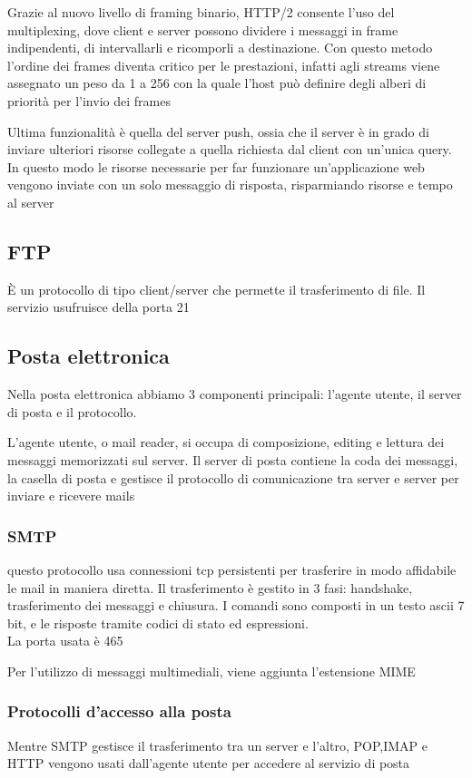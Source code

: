 \documentclass[12pt, a4paper]{article}
\begin{document}
Grazie al nuovo livello di framing binario,  HTTP/2 consente l'uso del multiplexing, dove client e server possono dividere
i messaggi in frame indipendenti, di intervallarli e ricomporli a destinazione. Con questo metodo l'ordine dei frames 
diventa critico per le prestazioni, infatti agli streams viene assegnato un peso da 1 a 256 con la quale l'host può
definire degli alberi di priorità per l'invio dei frames

Ultima funzionalità è quella del server push, ossia che il server è in grado di inviare ulteriori risorse collegate a quella
richiesta dal client con un'unica query. In questo modo le risorse necessarie per far funzionare un'applicazione web vengono
inviate con un solo messaggio di risposta, risparmiando risorse e tempo al server

\subsection{FTP}
È un protocollo di tipo client/server che permette il trasferimento di file. Il servizio usufruisce della porta 21

\subsection{Posta elettronica}
Nella posta elettronica abbiamo 3 componenti principali: l'agente utente, il server di posta e il protocollo.

L'agente utente, o mail reader, si occupa di composizione, editing e lettura dei messaggi memorizzati sul server. Il server
di posta contiene la coda dei messaggi, la casella di posta e gestisce il protocollo di comunicazione tra server e server
per inviare e ricevere mails

\subsubsection{SMTP}
questo protocollo usa connessioni tcp persistenti per trasferire in modo affidabile le mail in maniera diretta. Il 
trasferimento è gestito in 3 fasi: handshake, trasferimento dei messaggi e chiusura.
I comandi sono composti in un testo ascii 7 bit, e le risposte tramite codici di stato ed espressioni.\\ La porta
usata è 465

Per l'utilizzo di messaggi multimediali, viene aggiunta l'estensione MIME

\subsubsection*{Protocolli d'accesso alla posta}
Mentre SMTP gestisce il trasferimento tra un server e l'altro, POP,IMAP e HTTP vengono usati dall'agente utente per accedere
al servizio di posta
\end{document}
